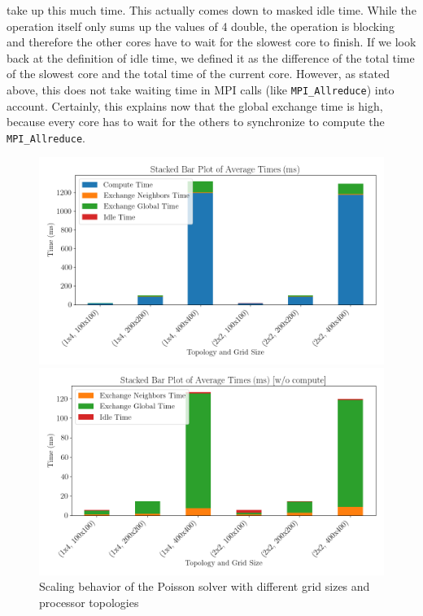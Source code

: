 take up this much time. This actually comes down to masked idle time. While the operation itself only sums up the values of 4 double, the operation is blocking and therefore the other cores have to wait for the slowest core to finish. If we look back at the definition of idle time, we defined it as the difference of the total time of the slowest core and the total time of the current core. However, as stated above, this does not take waiting time in MPI calls (like \texttt{MPI\_Allreduce}) into account. Certainly, this explains now that the global exchange time is high, because every core has to wait for the others to synchronize to compute the \texttt{MPI\_Allreduce}.\\
\begin{figure}[H]
    \centering
    \begin{minipage}{0.48\textwidth}
        \centering
        \includegraphics[width=\linewidth]{../fig/lab2/average_times_stacked_bar_22.png}
    \end{minipage}%
    \hspace{0.02\textwidth}
    \begin{minipage}{0.48\textwidth}
        \centering
        \includegraphics[width=\linewidth]{../fig/lab2/average_times_stacked_bar_no_comp_22.png}
    \end{minipage}
    \caption{Scaling behavior of the Poisson solver with different grid sizes and processor topologies}
    \label{fig:timingbar}
\end{figure}
